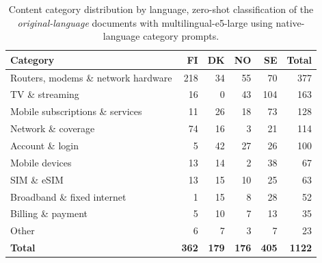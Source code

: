 \begin{table}[h]
\centering
\caption{Content category distribution by language, zero-shot classification of the \emph{original-language} documents with multilingual-e5-large using native-language category prompts.}
\label{tab:categories}
\begin{tabular}{lrrrrr}
\toprule
\textbf{Category} & \textbf{FI} & \textbf{DK} & \textbf{NO} & \textbf{SE} & \textbf{Total} \\
\midrule
Routers, modems \& network hardware & 218 & 34 & 55 & 70 & 377 \\
TV \& streaming & 16 & 0 & 43 & 104 & 163 \\
Mobile subscriptions \& services & 11 & 26 & 18 & 73 & 128 \\
Network \& coverage & 74 & 16 & 3 & 21 & 114 \\
Account \& login & 5 & 42 & 27 & 26 & 100 \\
Mobile devices & 13 & 14 & 2 & 38 & 67 \\
SIM \& eSIM & 13 & 15 & 10 & 25 & 63 \\
Broadband \& fixed internet & 1 & 15 & 8 & 28 & 52 \\
Billing \& payment & 5 & 10 & 7 & 13 & 35 \\
Other & 6 & 7 & 3 & 7 & 23 \\
\midrule
\textbf{Total} & \textbf{362} & \textbf{179} & \textbf{176} & \textbf{405} & \textbf{1122} \\
\bottomrule
\end{tabular}
\end{table}
